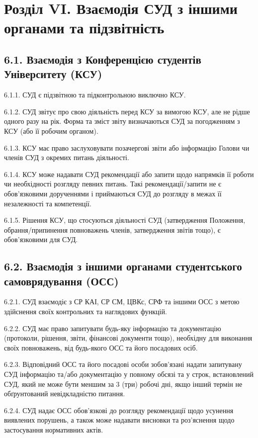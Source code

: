 \section*{Розділ VI. Взаємодія СУД з іншими органами та підзвітність}

\subsection*{6.1. Взаємодія з Конференцією студентів Університету (КСУ)}
    6.1.1. СУД є підзвітною та підконтрольною виключно КСУ.

    6.1.2. СУД звітує про свою діяльність перед КСУ за вимогою КСУ, але не рідше одного разу на рік. Форма та зміст звіту визначаються СУД за погодженням з КСУ (або її робочим органом).

    6.1.3. КСУ має право заслуховувати позачергові звіти або інформацію Голови чи членів СУД з окремих питань діяльності.

    6.1.4. КСУ може надавати СУД рекомендації або запити щодо напрямків її роботи чи необхідності розгляду певних питань. Такі рекомендації/запити не є обов'язковими дорученнями і приймаються СУД до розгляду в межах її незалежності та компетенції.

    6.1.5. Рішення КСУ, що стосуються діяльності СУД (затвердження Положення, обрання/припинення повноважень членів, затвердження звітів тощо), є обов'язковими для СУД.

\subsection*{6.2. Взаємодія з іншими органами студентського самоврядування (ОСС)}
    6.2.1. СУД взаємодіє з СР КАІ, СР СМ, ЦВКс, СРФ та іншими ОСС з метою здійснення своїх контрольних та наглядових функцій.

    6.2.2. СУД має право запитувати будь-яку інформацію та документацію (протоколи, рішення, звіти, фінансові документи тощо), необхідну для виконання своїх повноважень, від будь-якого ОСС та його посадових осіб.

    6.2.3. Відповідний ОСС та його посадові особи зобов'язані надати запитувану СУД інформацію та/або документацію у повному обсязі та у строк, встановлений СУД, який не може бути меншим за 3 (три) робочі дні, якщо інший термін не обґрунтований невідкладністю питання.

    6.2.4. СУД надає ОСС обов'язкові до розгляду рекомендації щодо усунення виявлених порушень, а також може надавати висновки та роз'яснення щодо застосування нормативних актів.

